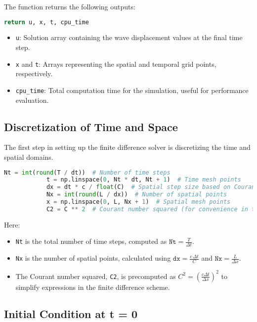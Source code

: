 \documentclass{article}
\begin{document}
		The function returns the following outputs:
		\begin{lstlisting}[language=Python, caption=Function Return]
			return u, x, t, cpu_time
		\end{lstlisting}
		\begin{itemize}
			\item \texttt{u}: Solution array containing the wave displacement values at the final time step.
			\item \texttt{x} and \texttt{t}: Arrays representing the spatial and temporal grid points, respectively.
			\item \texttt{cpu\_time}: Total computation time for the simulation, useful for performance evaluation.
		\end{itemize}
		
		\subsection{Discretization of Time and Space}
		
		The first step in setting up the finite difference solver is discretizing the time and spatial domains.
		
		\begin{lstlisting}[language=Python, caption=Discretization of Time and Space]
			Nt = int(round(T / dt))  # Number of time steps
			t = np.linspace(0, Nt * dt, Nt + 1)  # Time mesh points
			dx = dt * c / float(C)  # Spatial step size based on Courant number
			Nx = int(round(L / dx))  # Number of spatial points
			x = np.linspace(0, L, Nx + 1)  # Spatial mesh points
			C2 = C ** 2  # Courant number squared (for convenience in the scheme)
		\end{lstlisting}
		
		Here:
		\begin{itemize}
			\item \texttt{Nt} is the total number of time steps, computed as $\texttt{Nt} = \frac{T}{\Delta t}$.
			\item \texttt{Nx} is the number of spatial points, calculated using $\texttt{dx} = \frac{c \, \Delta t}{C}$ and $\texttt{Nx} = \frac{L}{\Delta x}$.
			\item The Courant number squared, \texttt{C2}, is precomputed as $C^2 = \left( \frac{c \Delta t}{\Delta x} \right)^2$ to simplify expressions in the finite difference scheme.
		\end{itemize}
		
		\subsection{Initial Condition at t = 0}
		
\end{document}
